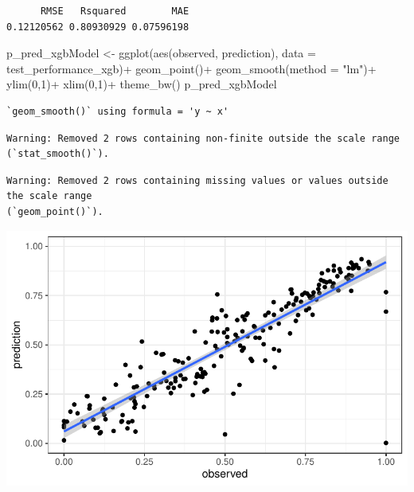 \documentclass[
  letterpaper,
  DIV=11,
  numbers=noendperiod]{scrartcl}
\newenvironment{Shaded}{\begin{snugshade}}{\end{snugshade}}
\newcommand{\AttributeTok}[1]{\textcolor[rgb]{0.40,0.45,0.13}{#1}}
\newcommand{\DecValTok}[1]{\textcolor[rgb]{0.68,0.00,0.00}{#1}}
\newcommand{\FunctionTok}[1]{\textcolor[rgb]{0.28,0.35,0.67}{#1}}
\newcommand{\NormalTok}[1]{\textcolor[rgb]{0.00,0.23,0.31}{#1}}
\newcommand{\OtherTok}[1]{\textcolor[rgb]{0.00,0.23,0.31}{#1}}
\newcommand{\SpecialCharTok}[1]{\textcolor[rgb]{0.37,0.37,0.37}{#1}}
\newcommand{\StringTok}[1]{\textcolor[rgb]{0.13,0.47,0.30}{#1}}
\begin{document}
\begin{verbatim}
      RMSE   Rsquared        MAE 
0.12120562 0.80930929 0.07596198 
\end{verbatim}

\begin{Shaded}
\begin{Highlighting}[]
\NormalTok{p\_pred\_xgbModel }\OtherTok{\textless{}{-}} \FunctionTok{ggplot}\NormalTok{(}\FunctionTok{aes}\NormalTok{(observed, prediction), }\AttributeTok{data =}\NormalTok{ test\_performance\_xgb)}\SpecialCharTok{+}
    \FunctionTok{geom\_point}\NormalTok{()}\SpecialCharTok{+}
    \FunctionTok{geom\_smooth}\NormalTok{(}\AttributeTok{method =} \StringTok{"lm"}\NormalTok{)}\SpecialCharTok{+}
    \FunctionTok{ylim}\NormalTok{(}\DecValTok{0}\NormalTok{,}\DecValTok{1}\NormalTok{)}\SpecialCharTok{+}
    \FunctionTok{xlim}\NormalTok{(}\DecValTok{0}\NormalTok{,}\DecValTok{1}\NormalTok{)}\SpecialCharTok{+}
    \FunctionTok{theme\_bw}\NormalTok{()}
\NormalTok{p\_pred\_xgbModel}
\end{Highlighting}
\end{Shaded}

\begin{verbatim}
`geom_smooth()` using formula = 'y ~ x'
\end{verbatim}

\begin{verbatim}
Warning: Removed 2 rows containing non-finite outside the scale range
(`stat_smooth()`).
\end{verbatim}

\begin{verbatim}
Warning: Removed 2 rows containing missing values or values outside the scale range
(`geom_point()`).
\end{verbatim}

\includegraphics{MachineLearning_StaticPatterNN_Report_files/figure-pdf/final-models-xgb-1.pdf}
\end{document}
